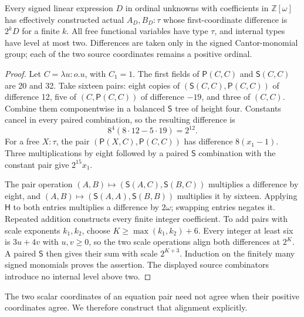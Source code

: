 \begin{lemma}\label{lem:pair-compiler}
Every signed linear expression $D$ in ordinal unknowns with coefficients
in $\mathbb Z[\omega]$ has effectively constructed actual $A_D,B_D:\tau$
whose first-coordinate difference is $2^kD$ for a finite $k$.
All free functional variables have type $\tau$, and internal types have
level at most two.  Differences are taken only in the signed Cantor-monomial
group; each of the two source coordinates remains a positive ordinal.
\end{lemma}
\begin{proof}
Let $C=\lambda u:o.u$, with $C_1=1$.  The first fields of
$\mathsf P(C,C)$ and $\mathsf S(C,C)$ are 20 and 32.  Take sixteen pairs:
eight copies of $(\mathsf S(C,C),\mathsf P(C,C))$ of difference 12,
five of $(C,\mathsf P(C,C))$ of difference $-19$, and three of $(C,C)$.
Combine them componentwise in a balanced $\mathsf S$ tree of height four.
Constants cancel in every paired combination, so the resulting difference is
\[
 8^4(8\cdot12-5\cdot19)=2^{12}.
\]
For a free $X:\tau$, the pair
$(\mathsf P(X,C),\mathsf P(C,C))$ has difference $8(x_1-1)$.
Three multiplications by eight followed by a paired $\mathsf S$ combination
with the constant pair give $2^{15}x_1$.

The pair operation $(A,B)\mapsto(\mathsf S(A,C),\mathsf S(B,C))$
multiplies a difference by eight, and
$(A,B)\mapsto(\mathsf S(A,A),\mathsf S(B,B))$ multiplies it by sixteen.
Applying $\mathsf H$ to both entries multiplies a difference by $2\omega$;
swapping entries negates it.  Repeated addition constructs every finite
integer coefficient.  To add pairs with scale exponents $k_1,k_2$, choose
$K\ge\max(k_1,k_2)+6$.  Every integer at least six is $3u+4v$ with
$u,v\ge0$, so the two scale operations align both differences at $2^K$.
A paired $\mathsf S$ then gives their sum with scale $2^{K+3}$.
Induction on the finitely many signed monomials proves the assertion.
The displayed source combinators introduce no internal level above two.
\end{proof}

The two scalar coordinates of an equation pair need not agree when their
positive coordinates agree.  We therefore construct that alignment explicitly.

